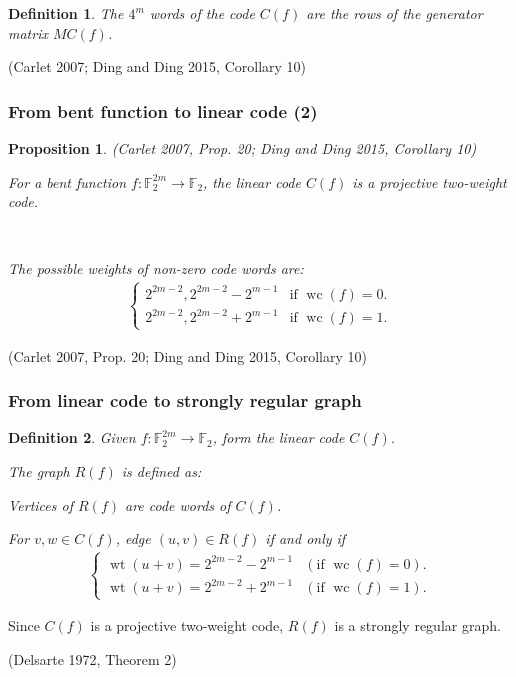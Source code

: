 \documentclass[pdf,sprung,slideColor,nocolorBG]{beamer}
\newenvironment{colortheme}[1]{
\def\ProvidesPackageRCS $##1${\relax}
\renewcommand{\ProcessOptions}{\relax}
\makeatletter

\makeatother
}{}
\newcommand{\slidecite}[1]{\tiny{(#1)}\normalsize{}}
\newcommand{\smallcite}[1]{\small{(#1)}\normalsize{}}
\newcommand{\mb}[1]{\mathbb{#1}}
\newcommand{\To}{\rightarrow}
\newcommand{\weight}[1]{\operatorname{wt}\left(#1\right)}
\newcommand{\weightclass}[1]{\operatorname{wc}\left(#1\right)}
\newcommand{\F}{\mb{F}}
\newtheorem{Def}{Definition}
\newtheorem{Proposition}{Proposition}
\begin{document}
\begin{colortheme}{seagull}
\begin{frame}
\begin{Def}
The $4^m$ words of the code $C(f)$ are the rows of the generator matrix $M C(f)$.
\end{Def}

\slidecite{Carlet 2007; Ding and Ding 2015, Corollary 10}

\end{frame}
\begin{frame}
\frametitle{From bent function to linear code (2)}
\begin{Proposition}
\smallcite{Carlet 2007, Prop. 20; Ding and Ding 2015, Corollary 10}

For a bent function $f : \F_2^{2m} \To \F_2$, the linear code $C(f)$
is a projective two-weight code.

~

The possible weights of non-zero code words are:
\begin{align*}
\begin{cases}
2^{2m-2}, 2^{2m-2} - 2^{m-1} & \text{if~} \weightclass{f}=0.
\\
2^{2m-2}, 2^{2m-2} + 2^{m-1} & \text{if~} \weightclass{f}=1.
\end{cases}
\end{align*}

\end{Proposition}

\slidecite{Carlet 2007, Prop. 20; Ding and Ding 2015, Corollary 10}

\end{frame}

\begin{frame}
\frametitle{From linear code to strongly regular graph}
\begin{Def}
\label{R-f-def}
Given $f : \F_2^{2m} \To \F_2$, form the linear code $C(f)$.

The graph $R(f)$ is defined as:

Vertices of $R(f)$ are code words of $C(f)$.

For $v,w \in C(f)$, edge $(u,v) \in R(f)$ if and only if
\begin{align*}
\begin{cases}
\weight{u+v} = 2^{2m-2} - 2^{m-1} & (\text{if~}\weightclass{f}=0).
\\
\weight{u+v} = 2^{2m-2} + 2^{m-1} & (\text{if~}\weightclass{f}=1).
\end{cases}
\end{align*}

\end{Def}
Since $C(f)$ is a projective two-weight code,
$R(f)$ is a strongly regular graph.

\slidecite{Delsarte 1972, Theorem 2}
\end{frame}

\end{colortheme}
\end{document}
